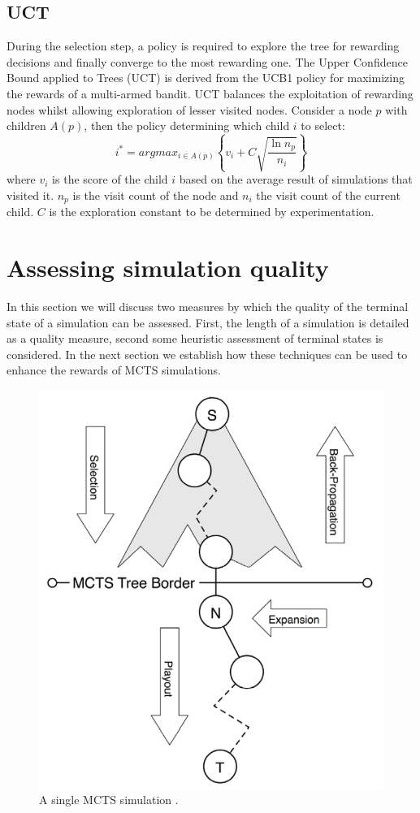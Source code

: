 \documentclass{ecai2010}
\begin{document}
\subsection{UCT}
\label{subsec:uct}
During the selection step, a policy is required to explore the tree for rewarding decisions and finally converge to the most rewarding one. The Upper Confidence Bound applied to Trees (UCT) \cite{kocsis2006bandit} is derived from the UCB1 policy \cite{auer2002using} for maximizing the rewards of a multi-armed bandit. UCT balances the exploitation of rewarding nodes whilst allowing exploration of lesser visited nodes. Consider a node $p$ with children $A(p)$, then the policy determining which child $i$ to select:
\begin{equation}
\label{eq:uct}
i^* = argmax_{i \in A(p)}\left\{ v_i + C \sqrt{ \frac{\ln{n_p}}{n_i}}\right\}
\end{equation}
where $v_i$ is the score of the child $i$ based on the average result of simulations that visited it. $n_p$ is the visit count of the node and $n_i$ the visit count of the current child. $C$ is the exploration constant to be determined by experimentation.

\section{Assessing simulation quality}
\label{sec:poqual}

In this section we will discuss two measures by which the quality of the terminal state of a simulation can be assessed. First, the length of a simulation is detailed as a quality measure, second some heuristic assessment of terminal states is considered. In the next section we establish how these techniques can be used to enhance the rewards of MCTS simulations.

\begin{figure}[ht]
	\centering
	\includegraphics[width=.3\textwidth]{img/figure2.png}
	\caption{A single MCTS simulation \cite{finnsson2010learning}.}
	\label{fig:mcts-simulation}
\end{figure}
\end{document}
